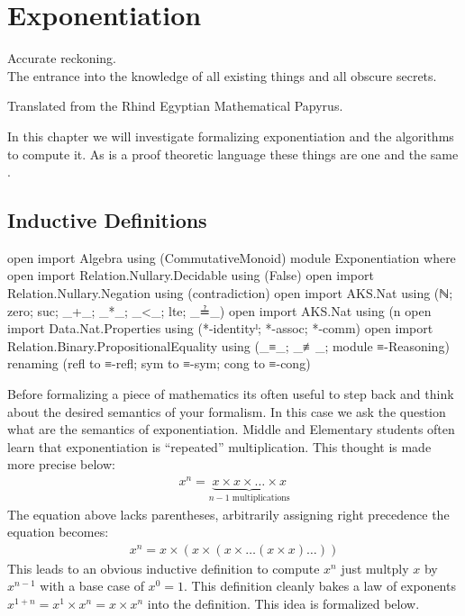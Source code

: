 \documentclass[./Thesis.tex]{subfiles}
\begin{document}
\chapter{Exponentiation}
\label{chap:exponentiation}

\epigraph{
  Accurate reckoning. \\
  The entrance into the knowledge of all existing
  things and all obscure secrets.
}{
  Translated from the Rhind Egyptian Mathematical Papyrus.
  \cite{rhind-papyrus}
}

In this chapter we will investigate formalizing exponentiation and the
algorithms to compute it. As \Agda{} is a proof theoretic language these things
are one and the same \cite{hott-book}.

\section{Inductive Definitions}
\label{sec:inductive-definitions}

\begin{code}[hide]
  open import Algebra using (CommutativeMonoid)
  module Exponentiation where
  open import Relation.Nullary.Decidable using (False)
  open import Relation.Nullary.Negation using (contradiction)
  open import AKS.Nat using (ℕ; zero; suc; _+_; _*_; _<_; lte; _≟_)
  open import AKS.Nat using (n%
  open import Data.Nat.Properties using (*-identityˡ; *-assoc; *-comm)
  open import Relation.Binary.PropositionalEquality using (_≡_; _≢_; module ≡-Reasoning) renaming (refl to ≡-refl; sym to ≡-sym; cong to ≡-cong)
\end{code}

Before formalizing a piece of mathematics its often useful to step
back and think about the desired semantics of your formalism. In this case we
ask the question what are the semantics of exponentiation. Middle and Elementary
students often learn that exponentiation is ``repeated'' multiplication. This
thought is made more precise below:
\begin{align}
  \label{eqn:exp-first-idea}
  x^n = \underbrace{x \times x \times \dots \times x}_{n - 1 \text{ multiplications}}
\end{align}
The equation above lacks parentheses, arbitrarily assigning right precedence
the equation becomes:
\begin{align}
  \label{eqn:exp-second-idea}
  x^n = x \times (x \times (x \times \dots (x \times x) \dots ))
\end{align}
This leads to an obvious inductive definition to compute $x^n$ just multply $x$
by $x^{n -1}$ with a base case of $x^0 = 1$. This definition cleanly bakes a law
of exponents $x^{1+n} = x^1 \times x^n = x \times x^n$ into the definition. This
idea is formalized below. \\
\end{document}
